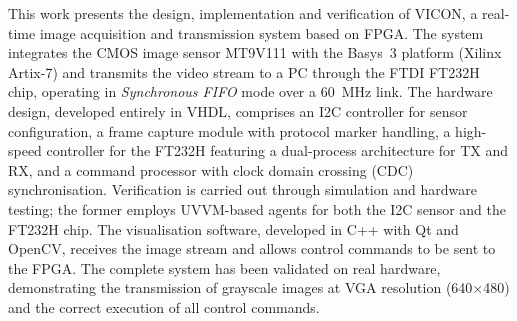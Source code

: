 This work presents the design, implementation and verification of VICON, a real-time image acquisition and transmission system based on FPGA. The system integrates the CMOS image sensor MT9V111 with the Basys~3 platform (Xilinx Artix-7) and transmits the video stream to a PC through the FTDI FT232H chip, operating in \textit{Synchronous FIFO} mode over a 60~MHz link. The hardware design, developed entirely in VHDL, comprises an I2C controller for sensor configuration, a frame capture module with protocol marker handling, a high-speed controller for the FT232H featuring a dual-process architecture for TX and RX, and a command processor with clock domain crossing (CDC) synchronisation. Verification is carried out through simulation and hardware testing; the former employs UVVM-based agents for both the I2C sensor and the FT232H chip. The visualisation software, developed in C++ with Qt and OpenCV, receives the image stream and allows control commands to be sent to the FPGA. The complete system has been validated on real hardware, demonstrating the transmission of grayscale images at VGA resolution (640$\times$480) and the correct execution of all control commands.


\providecommand{\keywords}[1]
{
	\small	
	\textbf{\textit{Keywords---}} #1

}			

\vfill